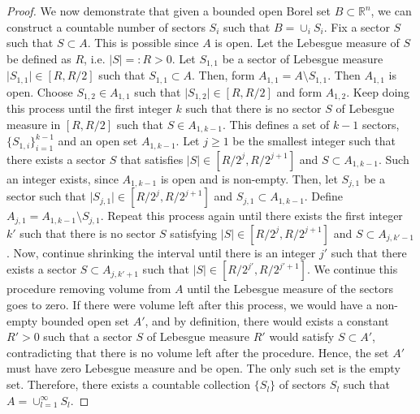 \documentclass{amsart}
\theoremstyle{lemma}
\theoremstyle{remark}
\begin{document}
\begin{proof}
We now demonstrate that given a bounded open Borel set $B \subset \mathbb{R}^n$, we can construct a countable number of sectors $S_i$ such that $B = \cup_{i} S_i$. Fix a sector $S$ such that $S \subset A$. This is possible since $A$ is open. Let the Lebesgue measure of $S$ be defined as $R$, i.e. $\vert S \vert =:R>0$. Let $S_{1, 1}$ be a sector of Lebesgue measure $\vert S_{1,1} \vert \in [R, R/2]$ such that $S_{1,1} \subset A$. Then, form $A_{1,1} = A \setminus S_{1,1}$. Then $A_{1, 1}$ is open. Choose $S_{1, 2} \in A_{1, 1}$ such that $\vert S_{1, 2} \vert \in [R, R/2]$ and form $A_{1, 2}$. Keep doing this process until the first integer $k$ such that there is no sector $S$ of Lebesgue measure in $[R,R/2]$ such that $S \in A_{1, k-1}$. This defines a set of $k-1$ sectors, $\{S_{1, i} \}_{i=1}^{k-1}$ and an open set $A_{1, k-1}$. Let $j\geq 1$ be the smallest integer such that there exists a sector $S$ that satisfies $\vert S \vert \in [R/2^{j}, R/2^{j+1}]$ and $S \subset A_{1, k-1}$. Such an integer exists, since $A_{1, k-1}$ is open and is non-empty. Then, let $S_{j, 1}$ be a sector such that $\vert S_{j, 1} \vert \in [R/2^{j}, R/2^{j+1}]$ and $S_{j, 1} \subset A_{1, k-1}$. Define $A_{j, 1} = A_{1, k-1} \setminus S_{j, 1}$. Repeat this process again until there exists the first integer $k'$ such that there is no sector $S$ satisfying $\vert S \vert \in [R/2^{j}, R/2^{j+1}]$ and $S \subset A_{j, k'-1}$. Now, continue shrinking the interval until there is an integer $j'$ such that there exists a sector $S \subset A_{j, k'+1}$ such that $\vert S \vert \in [R/2^{j'}, R/2^{j'+1}]$. We continue this procedure removing volume from $A$ until the Lebesgue measure of the sectors goes to zero. If there were volume left after this process, we would have a non-empty bounded open set $A'$, and by definition, there would exists a constant $R'>0$ such that a sector $S$ of Lebesgue measure $R'$ would satisfy $S \subset A'$, contradicting that there is no volume left after the procedure. Hence, the set $A'$ must have zero Lebesgue measure and be open. The only such set is the empty set. Therefore, there exists a countable collection $\{ S_l\}$ of sectors $S_l$ such that $A = \cup_{l=1}^{\infty} S_{l}$.


\end{proof}
\end{document}
